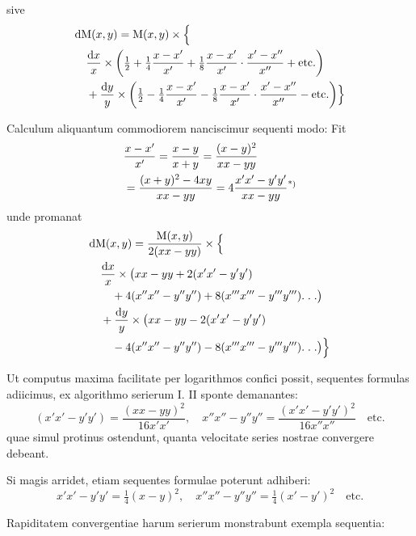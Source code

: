 sive
\[
\begin{aligned}
&\mathrm{d}\mathrm{M}(x,y)=\mathrm{M}(x,y)\times\Bigl\{\\&\quad\frac{\mathrm{d}x}{x}\times\left(\tfrac12+\tfrac14\frac{x-x'}{x'}+\tfrac18\frac{x-x'}{x'}\cdot\frac{x'-x''}{x''}+\mathrm{etc.}\right)\\&\quad+\frac{\mathrm{d}y}{y}\times\left(\tfrac12-\tfrac14\frac{x-x'}{x'}-\tfrac18\frac{x-x'}{x'}\cdot\frac{x'-x''}{x''}-\mathrm{etc.}\right)\Bigr\}
\end{aligned}
\]
\par Calculum aliquantum commodiorem nanciscimur sequenti modo: Fit
\[
\begin{aligned}&\frac{x-x'}{x'}=\frac{x-y}{x+y}=\frac{(x-y)^2}{xx-yy}\\&=\frac{(x+y)^2-4xy}{xx-yy}=4\frac{x'x'-y'y'}{xx-yy}\text{\textsuperscript{*)}}\end{aligned}
\]
unde promanat
\[
\begin{aligned}
&\mathrm{d}\mathrm{M}(x,y)=\frac{\mathrm{M}(x,y)}{2(xx-yy)}\times\Bigl\{\\&\quad\frac{\mathrm{d}x}{x}\times\bigl(xx-yy+2(x'x'-y'y')\\&\qquad+4(x''x''-y''y'')+8(x'''x'''-y'''y''').\;.\;.\bigr)\\&\quad+\frac{\mathrm{d}y}{y}\times\bigl(xx-yy-2(x'x'-y'y')\\&\qquad-4(x''x''-y''y'')-8(x'''x'''-y'''y''').\;.\;.\bigr)\Bigr\}
\end{aligned}
\]
\par 
Ut computus maxima facilitate per logarithmos confici possit, sequentes formulas adiicimus, ex algorithmo serierum I. II sponte demanantes:
\[
(x'x'-y'y')=\frac{(xx-yy)^2}{16x'x'},\quad
x''x''-y''y''=\frac{(x'x'-y'y')^2}{16x''x''}\quad\mathrm{etc.}
\]
quae simul protinus ostendunt, quanta velocitate series nostrae convergere debeant.

\par Si magis arridet, etiam sequentes formulae poterunt adhiberi:
\[
x'x'-y'y'=\tfrac14(x-y)^2,\quad
x''x''-y''y''=\tfrac14(x'-y')^2\quad\mathrm{etc.}
\]

Rapiditatem convergentiae harum serierum monstrabunt exempla sequentia:

